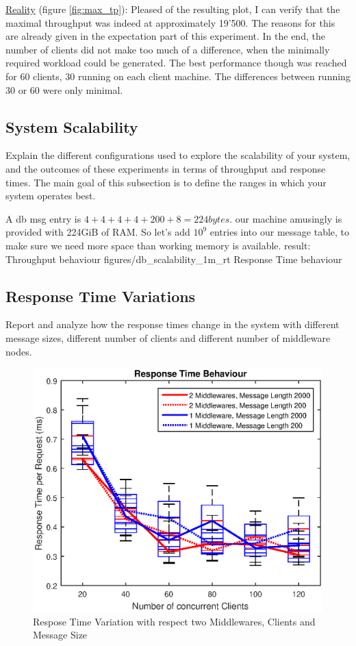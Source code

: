\documentclass[11pt]{article}
\begin{document}
\newline\underline{Reality} (figure \ref{fig:max_tp}): Pleased of the resulting plot, I can verify that the maximal throughput was indeed at approximately 19'500. The reasons for this are already given in the expectation part of this experiment. In the end, the number of clients did not make too much of a difference, when the minimally required workload could be generated. The best performance though was reached for 60 clients, 30 running on each client machine. The differences between running 30 or 60 were only minimal.

\subsection{System Scalability}\label{sec:system-scalability}

Explain the different configurations used to explore the scalability of
your system, and the outcomes of these experiments in terms of
throughput and response times. The main goal of this subsection is to
define the ranges in which your system operates best.

A db msg entry is $4+4+4+4+200+8=224bytes$. our machine amusingly is provided with 224GiB of RAM. So let's add $10^9$ entries into our message table, to make sure we need more space than working memory is available.
result:
 {Throughput behaviour} {}
		{figures/db_scalability_1m_rt} {Response Time behaviour} {}
\subsection{Response Time Variations}\label{sec:response-time-variations}

Report and analyze how the response times change in the system with
different message sizes, different number of clients and different
number of middleware nodes.
\begin{figure}[!htb]
\centering
\includegraphics[width=0.7\linewidth]{figures/rt_experiment}
\caption{Respose Time Variation with respect two Middlewares, Clients and Message Size}
\label{fig:rt_experiment}
\end{figure}
\end{document}
